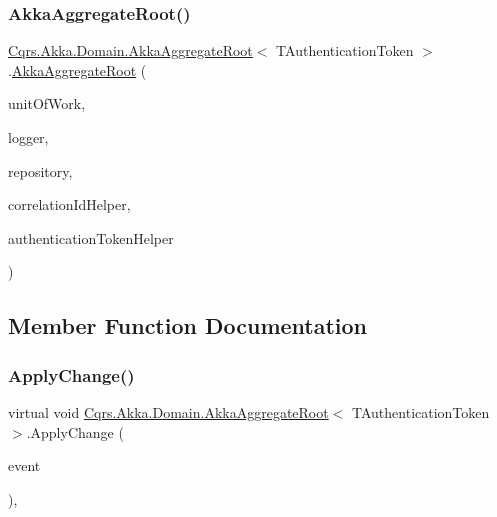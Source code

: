 \subsubsection{\texorpdfstring{Akka\+Aggregate\+Root()}{AkkaAggregateRoot()}}
{\footnotesize\ttfamily \hyperlink{classCqrs_1_1Akka_1_1Domain_1_1AkkaAggregateRoot}{Cqrs.\+Akka.\+Domain.\+Akka\+Aggregate\+Root}$<$ T\+Authentication\+Token $>$.\hyperlink{classCqrs_1_1Akka_1_1Domain_1_1AkkaAggregateRoot}{Akka\+Aggregate\+Root} (\begin{DoxyParamCaption}\item[{\hyperlink{interfaceCqrs_1_1Domain_1_1IUnitOfWork}{I\+Unit\+Of\+Work}$<$ T\+Authentication\+Token $>$}]{unit\+Of\+Work,  }\item[{I\+Logger}]{logger,  }\item[{\hyperlink{interfaceCqrs_1_1Akka_1_1Domain_1_1IAkkaRepository}{I\+Akka\+Repository}$<$ T\+Authentication\+Token $>$}]{repository,  }\item[{I\+Correlation\+Id\+Helper}]{correlation\+Id\+Helper,  }\item[{\hyperlink{interfaceCqrs_1_1Authentication_1_1IAuthenticationTokenHelper}{I\+Authentication\+Token\+Helper}$<$ T\+Authentication\+Token $>$}]{authentication\+Token\+Helper }\end{DoxyParamCaption})\hspace{0.3cm}{\ttfamily [protected]}}



\subsection{Member Function Documentation}
\mbox{\label{classCqrs_1_1Akka_1_1Domain_1_1AkkaAggregateRoot_aaa135cb26be9e5353986f5611f05c059}} 
\subsubsection{\texorpdfstring{Apply\+Change()}{ApplyChange()}}
{\footnotesize\ttfamily virtual void \hyperlink{classCqrs_1_1Akka_1_1Domain_1_1AkkaAggregateRoot}{Cqrs.\+Akka.\+Domain.\+Akka\+Aggregate\+Root}$<$ T\+Authentication\+Token $>$.Apply\+Change (\begin{DoxyParamCaption}\item[{\hyperlink{interfaceCqrs_1_1Events_1_1IEvent}{I\+Event}$<$ T\+Authentication\+Token $>$ @}]{event }\end{DoxyParamCaption})\hspace{0.3cm}{\ttfamily [protected]}, {\ttfamily [virtual]}}

